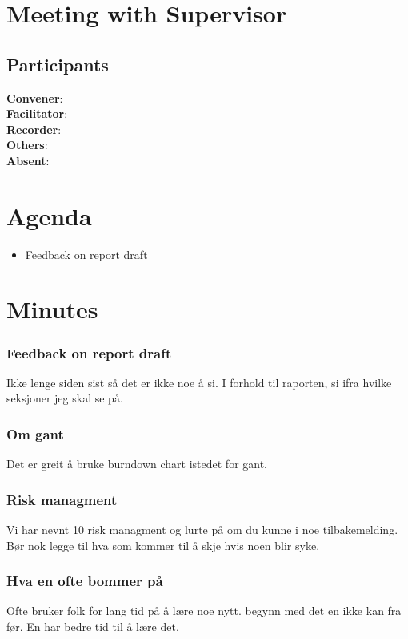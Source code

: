 \section*{Meeting with Supervisor}

\subsection*{Participants}

\textbf{Convener}: \supervisor{}\\
\textbf{Facilitator}: \facilitator{}  \\
\textbf{Recorder}: \scrummaster{}  \\
\textbf{Others}: \groupleader{} \\
\textbf{Absent}:

\section*{Agenda}
\begin{itemize}
    \item Feedback on report draft
\end{itemize}

\section*{Minutes}

\subsubsection*{Feedback on report draft}
Ikke lenge siden sist så det er ikke noe å si.
I forhold til raporten, si ifra hvilke seksjoner jeg skal se på.

\subsubsection{Om gant}
Det er greit å bruke burndown chart istedet for gant.

\subsubsection{Risk managment}
Vi har nevnt 10 risk managment og lurte på om du kunne i noe tilbakemelding.
Bør nok legge til hva som kommer til å skje hvis noen blir syke. 

\subsubsection*{Hva en ofte bommer på}
Ofte bruker folk for lang tid på å lære noe nytt. begynn med det en ikke kan fra før. En har bedre tid til å lære det.

